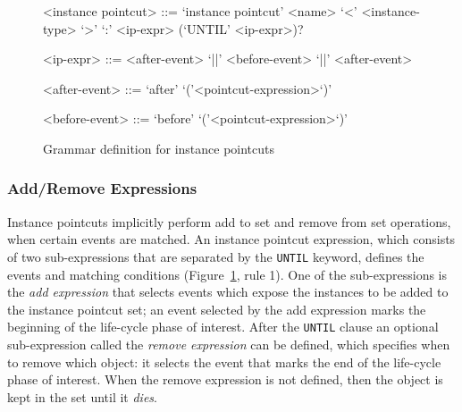 \documentclass{acm_proc_article-sp}
\begin{document}
\begin{figure}[h!]
\begin{grammar}
<instance pointcut> ::= `instance pointcut' <name> `<' <instance-type> `>' `:'
<ip-expr> (`UNTIL' <ip-expr>)? 

<ip-expr> ::= <after-event> `||' <before-event>  `||' <after-event>  

<after-event> ::= `after' `('<pointcut-expression>`)'

<before-event> ::= `before' `('<pointcut-expression>`)'
\end{grammar}
\caption{Grammar definition for instance pointcuts}
\label{fig:grammar1}
\end{figure}


\subsubsection{Add/Remove Expressions}
\label{sect:addrem}
Instance pointcuts implicitly perform add to set and remove from set operations, when certain events are matched. An instance pointcut expression, which consists of two sub-expressions that are separated by the \lstinline{UNTIL} keyword,  defines the events and matching conditions (Figure~\ref{fig:grammar1}, rule 1). One of the sub-expressions is the \emph{add expression} that selects events which expose the instances to be added to the instance pointcut set; an event selected by the add expression marks the beginning of the life-cycle phase of interest. After the \lstinline{UNTIL} clause an optional sub-expression called the \emph{remove expression} can be defined,  which specifies when to remove which object: it selects the event that marks the end of the life-cycle phase of interest. When the remove expression is not defined, then the object is kept in the set until it \emph{dies}.
\end{document}
